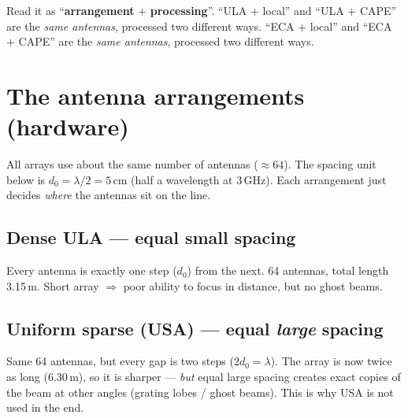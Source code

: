 \documentclass[11pt]{article}
\newcommand{\antrow}[3]{%
  \begin{scope}[xscale=0.075]
  \foreach \x in {#3} {\fill[#1] (\x,0) circle (1.1pt);}
  \end{scope}}
\begin{document}
\begin{keybox}
Read it as ``\textbf{arrangement} + \textbf{processing}''. ``ULA + local'' and ``ULA + CAPE'' are
the \emph{same antennas}, processed two different ways. ``ECA + local'' and ``ECA + CAPE'' are the
\emph{same antennas}, processed two different ways.
\end{keybox}

\section{The antenna arrangements (hardware)}

All arrays use about the same number of antennas ($\approx 64$). The spacing unit below is
$d_0=\lambda/2 = 5$\,cm (half a wavelength at 3\,GHz). Each arrangement just decides \emph{where}
the antennas sit on the line.

\subsection{Dense ULA --- equal small spacing}
Every antenna is exactly one step ($d_0$) from the next. 64 antennas, total length 3.15\,m.
Short array $\Rightarrow$ poor ability to focus in distance, but no ghost beams.
\begin{center}
\end{center}

\subsection{Uniform sparse (USA) --- equal \emph{large} spacing}
Same 64 antennas, but every gap is two steps ($2d_0=\lambda$). The array is now twice as long
(6.30\,m), so it is sharper --- \emph{but} equal large spacing creates exact copies of the beam at
other angles (grating lobes / ghost beams). This is why USA is not used in the end.
\begin{center}
\end{center}
\end{document}
